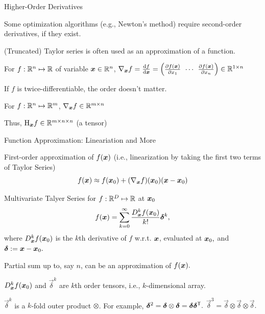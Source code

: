 \documentclass[handout,fleqn,aspectratio=169]{beamer}
\begin{document}
\begin{frame}{Higher-Order Derivatives}

\plitemsep 0.05in

\bci 
\item Some optimization algorithms (e.g., Newton's method) require second-order derivatives, if they exist. 
\item (Truncated) Taylor series is often used as an approximation of a function. 

\item For $f: {\mathbb R}^{n} \mapsto {\mathbb R}$ of variable $\bm{x} \in {\mathbb R}^{n}$, $
\grad_{\vec{x}} f = \d{f}{\vec{x}} = 
\rowvec{\pd{f(\vec{x})}{x_1} & \cdots & \pd{f(\vec{x})}{x_n}} \in \real^{1 \times n}
$
\bci
\item If $f$ is twice-differentiable, the order doesn't matter. 
\eci

\item For $f: {\mathbb R}^{n} \mapsto {\mathbb R}^{m}$, $\nabla _{\bm{x}} f \in {\mathbb R}^{m \times n}$
\bci
\item Thus, $\text{H} _{\bm{x}} f \in {\mathbb R}^{m \times n \times n}$ (a tensor)
\eci

\eci
\end{frame}

\begin{frame}{Function Approximation: Lineariation and More}

\plitemsep 0.1in

\bci 
\item First-order approximation of $f(\bm{x})$ (i.e., linearization by taking the first two terms of Taylor Series)
$$
f(\bm{x}) \approx f(\bm{x}_0) + (\nabla _{\bm{x}} f)(\bm{x}_0)(\bm{x}-\bm{x}_0)
$$

\item Multivariate Talyer Series for $f: {\mathbb R}^D \mapsto {\mathbb R}$ at $\bm{x}_0$
$$
f(\bm{x}) = \sum_{k=0}^\infty \frac{D^k_{\bm{x}} f(\bm{x}_0)}{k!} \bm{\delta}^k,
$$
where $D^k_{\bm{x}} f(\bm{x}_0)$ is the $k$th derivative of $f$ w.r.t. $\bm{x}$, evaluated at $\bm{x}_0,$ and $\bm{\delta} := \bm{x} - \bm{x}_0.$
\bci
\item Partial sum up to, say $n$, can be an approximation of $f(\bm{x}).$
\item $D^k_{\bm{x}} f(\bm{x}_0)$ and $\vec{\delta}^k$ are $k$th order tensors, i.e., $k$-dimensional array. 

\item $\vec{\delta}^k$ is a $k$-fold outer product $\otimes$. For example, $\bm{\delta}^2 = \bm{\delta} \otimes \bm{\delta} = \bm{\delta}{\bm{\delta}}^{\mathsf{T}}.$ $\vec{\delta}^3 = \vec{\delta} \otimes \vec{\delta} \otimes \vec{\delta}.$ 
\eci

\eci



\end{frame}
\end{document}
